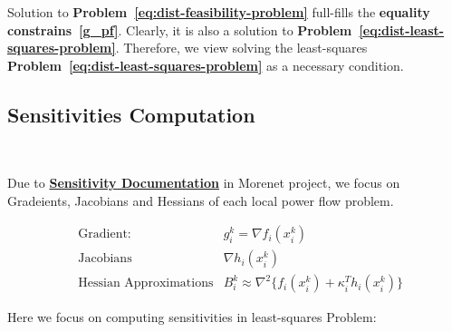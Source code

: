 \documentclass{article}
\begin{document}
\noindent Solution to \textbf{Problem~\ref{eq:dist-feasibility-problem}} full-fills the \textbf{equality constrains~\ref{g_pf}}. Clearly, it is also a solution to \textbf{Problem~\ref{eq:dist-least-squares-problem}}. Therefore, we view solving the least-squares \textbf{Problem~\ref{eq:dist-least-squares-problem}} as a necessary condition.


\subsection{Sensitivities Computation}~\label{sec: sensitivities computation}

Due to \textbf{\href{http://iai-webserv.iai.kit.edu/morenet/sensitivities/}{Sensitivity Documentation}} in Morenet project, we focus on Gradeients, Jacobians and Hessians of each local power flow problem. 

    \begin{subequations}
        \label{sensitivities}
        \begin{align}
             &\text{Gradient:} & g_i^k = \nabla f_i(x_i^k)\\
             &\text{Jacobians} & \nabla h_i(x^k_i)\\
             &\text{Hessian Approximations} & B^k_i \approx \nabla^2 \{f_i(x_i^k)+\kappa^T_i h_i(x^k_i) \}
        \end{align}
    \end{subequations}



\noindent Here we focus on computing sensitivities in least-squares Problem:
\end{document}
